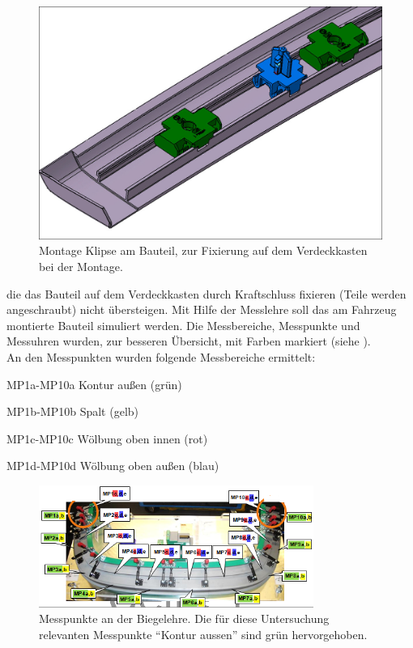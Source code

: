 \documentclass[12pt,a4paper,parskip,twoside,BCOR5mm,headsepline]{scrartcl}
\begin{document}
 \begin{figure}[H]
 \centering
 \includegraphics[width=.8\textwidth]{klip}
 \caption{Montage Klipse am Bauteil, zur Fixierung auf dem Verdeckkasten bei der Montage.}
 \label{fig:klip}
 \end{figure}
 
 
  die das Bauteil auf dem Verdeckkasten durch Kraftschluss fixieren (Teile werden angeschraubt) nicht übersteigen. Mit Hilfe der Messlehre soll  das am Fahrzeug montierte Bauteil simuliert werden.  Die Messbereiche, Messpunkte und Messuhren wurden, zur besseren Übersicht, mit Farben markiert (siehe ).  \\
 An den Messpunkten wurden folgende Messbereiche ermittelt:
 \begin{description*}
 \item[MP1a-MP10a] Kontur außen (grün)
 \item[MP1b-MP10b] Spalt (gelb)
 \item[MP1c-MP10c] Wölbung oben innen (rot)
 \item[MP1d-MP10d] Wölbung oben außen (blau)
 \end{description*}
\begin{figure}[hbtp]
\centering
\includegraphics[width=0.8\textwidth]{messpunktevdkda3}
\caption{Messpunkte an der Biegelehre. Die für diese Untersuchung relevanten Messpunkte "`Kontur aussen"' sind grün hervorgehoben.}
\label{fig:messpunktevdkda3}
\end{figure} 
 
\end{document}
